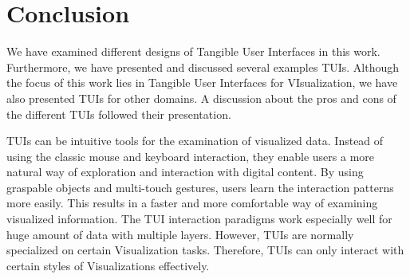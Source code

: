 \section{Conclusion}
We have examined different designs of Tangible User Interfaces in this work. Furthermore, we have presented and discussed several examples TUIs. Although the focus of this work lies in Tangible User Interfaces for VIsualization, we have also presented TUIs for other domains. A discussion about the pros and cons of the different TUIs followed their presentation. 

TUIs can be intuitive tools for the examination of visualized data. Instead of using the classic mouse and keyboard interaction, they enable users a more natural way of exploration and interaction with digital content. By using graspable objects and multi-touch gestures, users learn the interaction patterns more easily. This results in a faster and more comfortable way of examining visualized information. The TUI interaction paradigms work especially well for huge amount of data with multiple layers. However, TUIs are normally specialized on certain Visualization tasks. Therefore, TUIs can only interact with certain styles of Visualizations effectively. 